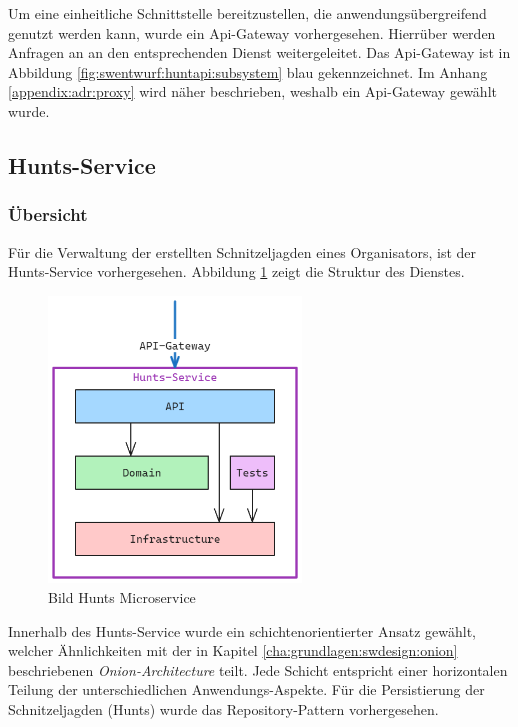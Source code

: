 Um eine einheitliche Schnittstelle bereitzustellen, die anwendungsübergreifend genutzt werden kann, wurde ein Api-Gateway vorhergesehen. Hierrüber werden Anfragen an an den entsprechenden Dienst weitergeleitet. Das Api-Gateway ist in Abbildung \ref{fig:swentwurf:huntapi:subsystem} blau gekennzeichnet. Im Anhang \ref{appendix:adr:proxy} wird näher beschrieben, weshalb ein Api-Gateway gewählt wurde.

\subsection{Hunts-Service} \label{cha:swentwurf:huntsservice}

\subsubsection{Übersicht}

Für die Verwaltung der erstellten Schnitzeljagden eines Organisators, ist der Hunts-Service vorhergesehen. Abbildung \ref{fig:swentwurf:huntapi:huntservice} zeigt die Struktur des Dienstes.

\begin{figure}[H]
    \centering
    \includegraphics[width=0.6\textwidth]{images/PrAr-Software-Entwurf-Hunt-Api-Hunt-Service.png}
    \caption{Bild Hunts Microservice}
    \label{fig:swentwurf:huntapi:huntservice}
\end{figure}

Innerhalb des Hunts-Service wurde ein schichtenorientierter Ansatz gewählt, welcher Ähnlichkeiten mit der in Kapitel \ref{cha:grundlagen:swdesign:onion} beschriebenen \textit{Onion-Architecture} teilt. Jede Schicht entspricht einer horizontalen Teilung der unterschiedlichen Anwendungs-Aspekte. Für die Persistierung der Schnitzeljagden (Hunts) wurde das Repository-Pattern vorhergesehen.

